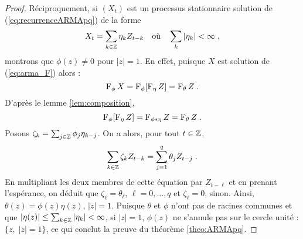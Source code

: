 \begin{proof}
R\'eciproquement, si $(X_t)$ est un processus stationnaire solution de (\ref{eq:recurrenceARMApq}) de la forme
$$X_t=\sum_{k\in\mathbb{Z}}\eta_k Z_{t-k} \quad  \text{o\`u} \quad  \sum_k |\eta_k|<\infty \;,
$$ 
montrons que $\phi(z)\neq 0$ pour $|z|= 1$. En effet, puisque $X$ est solution de (\ref{eq:arma_F})
alors : 
$$
\operatorname{F}_{\phi} X=\operatorname{F}_{\phi}[\operatorname{F}_{\eta} Z]=\operatorname{F}_{\theta} Z \;.
$$ 
D'apr\`es le lemme \ref{lem:composition},
$$
\operatorname{F}_{\phi}[\operatorname{F}_{\eta} Z]= \operatorname{F}_{\phi*\eta}Z=\operatorname{F}_{\theta} Z \;. 
$$
Posons
$\zeta_k=\sum_{j\in\mathbb{Z}}\phi_j \eta_{k-j}$. On a alors, pour tout $t\in\mathbb{Z}$,
$$
\sum_{k\in\mathbb{Z}}\zeta_k Z_{t-k}=\sum_{j=1}^q\theta_j Z_{t-j} \;.
$$
En multipliant les deux membres de cette \'equation par $Z_{t-\ell}$
et en prenant l'esp\'erance, on d\'eduit que $\zeta_\ell=\theta_\ell$,
$\ell=0,\dots,q$ et $\zeta_\ell=0$, sinon. Ainsi,
$\theta(z)=\phi(z)\eta(z)$, $|z|=1$. Puisque $\theta$ et $\phi$
n'ont pas de racines communes et que $|\eta(z)|\leq\sum_{k\in\mathbb{Z}}|\eta_k|<\infty$,
si $|z|=1$, $\phi(z)$ ne s'annule pas sur le cercle unit\'e :
$\{z,\; |z|=1\}$, ce qui conclut la preuve du th\'eor\`eme \ref{theo:ARMApq}.




\end{proof}
